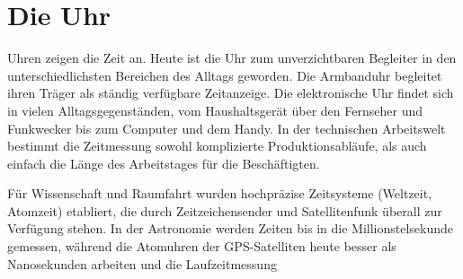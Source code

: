 \chapter{Die Uhr}
\lettrine[lines=3]{U}{}hren zeigen die Zeit an. Heute ist die Uhr zum unverzichtbaren Begleiter in den unterschiedlichsten Bereichen des Alltags geworden. Die Armbanduhr begleitet ihren Träger als ständig verfügbare Zeitanzeige. Die elektronische Uhr findet sich in vielen Alltagsgegenständen, vom Haushaltsgerät über den Fernseher und Funkwecker bis zum Computer und dem Handy. In der technischen Arbeitswelt bestimmt die Zeitmessung sowohl komplizierte Produktionsabläufe, als auch einfach die Länge des Arbeitstages für die Beschäftigten.

Für Wissenschaft und Raumfahrt wurden hochpräzise Zeitsysteme (Weltzeit, Atomzeit) etabliert, die durch Zeitzeichensender und Satellitenfunk überall zur Verfügung stehen. In der Astronomie werden Zeiten bis in die Millionstelsekunde gemessen, während die Atomuhren der GPS-Satelliten heute besser als Nanosekunden arbeiten und die Laufzeitmessung 
